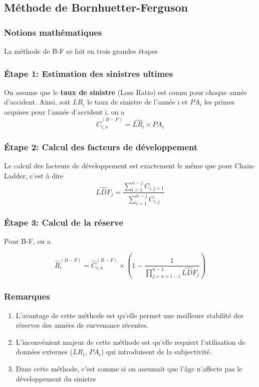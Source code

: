 \subsection*{Méthode de Bornhuetter-Ferguson}

\subsubsection*{Notions mathématiques}

La méthode de B-F se fait en trois grandes étapes

\subsubsection*{ Étape 1: Estimation des sinistres ultimes}

On assume que le \textbf{taux de sinistre} (Loss Ratio) est connu pour chaque année d'accident. Ainsi, soit $LR_i$ le taux de sinistre de l'année i et $PA_i$ les primes acquises pour l'année d'accident i, on a
$$\boxed{\widehat{C}_{i,n}^{(B-F)}=\widehat{LR_i} \times PA_i}$$

\subsubsection*{ Étape 2: Calcul des facteurs de développement }

Le calcul des facteurs de développement est exactement le même que pour Chain-Ladder, c'est à dire
$$\widehat{LDF}_j=\frac{\sum_{i=1}^{n-j} C_{i,j+1}}{\sum_{i=1}^{n-j} C_{i,j}}$$

\subsubsection*{ Étape 3: Calcul de la réserve }

Pour B-F, on a 

$$\boxed{\widehat{R}_i^{(B-F)}=\widehat{C}_{i,n}^{(B-F)}\times \left(1 - \frac{1}{\prod_{j=n+1-i}^{n-1} \widehat{LDF}_j} \right)}$$

\subsubsection*{  Remarques }

\begin{enumerate}
\item L'avantage de cette méthode est qu'elle permet une meilleure stabilité des réserves des années de survenance récentes.
\item L'inconvénient majeur de cette méthode est qu'elle requiert l'utilisation de données externes ($LR_i$, $PA_i$) qui introduisent de la subjectivité.
\item Dans cette méthode, c'est comme si on assumait que l'âge n'affecte pas le développement du sinistre
\end{enumerate}

